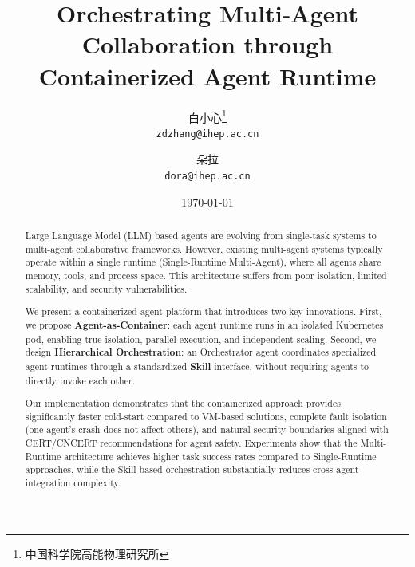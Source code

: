 \documentclass[11pt,a4paper]{article}
\title{\textbf{Orchestrating Multi-Agent Collaboration through\\Containerized Agent Runtime}}
\author{
    白小心\thanks{中国科学院高能物理研究所} \\
    \texttt{zdzhang@ihep.ac.cn}
    \and
    朵拉 \\
    \texttt{dora@ihep.ac.cn}
}
\date{\today}
\begin{document}
\maketitle

\begin{abstract}
Large Language Model (LLM) based agents are evolving from single-task systems to multi-agent collaborative frameworks. However, existing multi-agent systems typically operate within a single runtime (Single-Runtime Multi-Agent), where all agents share memory, tools, and process space. This architecture suffers from poor isolation, limited scalability, and security vulnerabilities.

We present a containerized agent platform that introduces two key innovations. First, we propose \textbf{Agent-as-Container}: each agent runtime runs in an isolated Kubernetes pod, enabling true isolation, parallel execution, and independent scaling. Second, we design \textbf{Hierarchical Orchestration}: an Orchestrator agent coordinates specialized agent runtimes through a standardized \textbf{Skill} interface, without requiring agents to directly invoke each other.

Our implementation demonstrates that the containerized approach provides significantly faster cold-start compared to VM-based solutions, complete fault isolation (one agent's crash does not affect others), and natural security boundaries aligned with CERT/CNCERT recommendations for agent safety. Experiments show that the Multi-Runtime architecture achieves higher task success rates compared to Single-Runtime approaches, while the Skill-based orchestration substantially reduces cross-agent integration complexity.
\end{abstract}












\appendix

\end{document}
